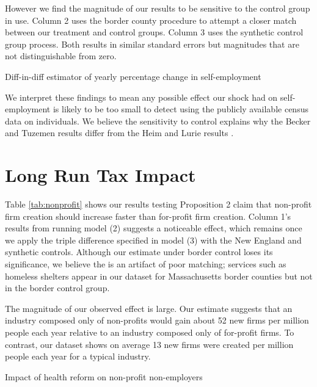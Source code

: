 However we find the magnitude of our results to be sensitive to the control group in use. Column 2 uses the border county procedure to attempt a closer match between our treatment and control groups. Column 3 uses the synthetic control group process. Both results in similar standard errors but magnitudes that are not distinguishable from zero. 
\begin{center}
	\begin{table}[h]
		\centering
			\caption{Diff-in-diff estimator of yearly percentage change in self-employment} 
			
		\label{tab:control}
	\end{table}		
\end{center}

We interpret these findings to mean any possible effect our shock had on self-employment is likely to be too small to detect using the publicly available census data on individuals. We believe the sensitivity to control explains why the Becker and Tuzemen \cite{tuzemen} results differ from the Heim and Lurie results \cite{heimLurie}. 

\section{Long Run Tax Impact}

Table \ref{tab:nonprofit} shows our results testing Proposition 2 claim that non-profit firm creation should increase faster than for-profit firm creation. Column 1's results from running model (2) suggests a noticeable effect, which remains once we apply the triple difference specified in model (3) with the New England and synthetic controls. Although our estimate under border control loses its significance, we believe the is an artifact of poor matching; services such as homeless shelters appear in our dataset for Massachusetts border counties but not in the border control group. 

The magnitude of our observed effect is large. Our estimate suggests that an industry composed only of non-profits would gain about 52 new firms per million people each year relative to an industry composed only of for-profit firms. To contrast, our dataset shows on average 13 new firms were created per million people each year for a typical industry. 

\begin{table}[h]
	\footnotesize
	\centering
	\caption{Impact of health reform on non-profit non-employers}
	
	\label{tab:nonprofit}
\end{table}

